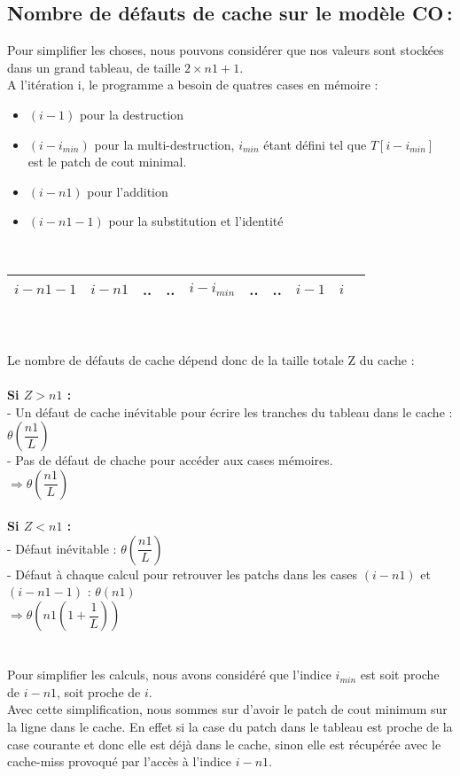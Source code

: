 \documentclass[a4paper, 10pt, french]{article}
\begin{document}
  \subsection{Nombre de défauts de cache sur le modèle CO\,: }
    Pour simplifier les choses, nous pouvons considérer que nos valeurs sont stockées dans un grand tableau, de taille $2 \times n1 + 1$.\\
    A l'itération i, le programme a besoin de quatres cases en mémoire :
    \begin{itemize}
    \item $(i-1)$ pour la destruction
    \item $(i - i_{min})$ pour la multi-destruction, $i_{min}$ étant défini tel que $T[i-i_{min}]$ est le patch de cout minimal.
    \item $(i - n1)$ pour l'addition
    \item $(i - n1 - 1)$ pour la substitution et l'identité \\
    \end{itemize}
    \ \ \ \ \ \ \ \ 
    \begin{tabular}{|c|c|c|c|c|c|c|c|c|c|}
    	\hline 
    	
    	 $i - n1 - 1$ & $i - n1$  &  .. & .. & $i - i_{min}$ & .. & .. & $i - 1$ & $i$ \\
    	 
    	\hline
    \end{tabular}
	 \\ \\
	Le nombre de défauts de cache dépend donc de la taille totale Z du cache :\\ \\
	\textbf{Si $Z > n1$ :} \\
		 - Un défaut de cache inévitable pour écrire les tranches du tableau dans le cache : $\theta(\dfrac{n1}{L})$ \\
		 - Pas de défaut de chache pour accéder aux cases mémoires. \\
		 $\Rightarrow \theta(\dfrac{n1}{L})$ \\ \\ 
	\textbf{Si $Z < n1$ :} \\
	- Défaut inévitable : $\theta(\dfrac{n1}{L})$ \\
	- Défaut à chaque calcul pour retrouver les patchs dans les cases $(i - n1)$ et  $(i - n1 - 1)$ : $\theta(n1)$ \\
 	$\Rightarrow \theta(n1 (1 + \dfrac{1}{L}) )$ \\ \\
 	\\
 	Pour simplifier les calculs, nous avons considéré que l'indice $i_{min}$ est soit proche de $i - n1$, soit proche de $i$. \\
 	Avec cette simplification, nous sommes sur d'avoir le patch de cout minimum sur la ligne dans le cache. En effet si la case du patch dans
 	le tableau est proche
 	de la case courante et donc elle est déjà dans le cache, sinon elle est récupérée avec le cache-miss provoqué par l'accès à l'indice
 	$i - n1$.
\end{document}
